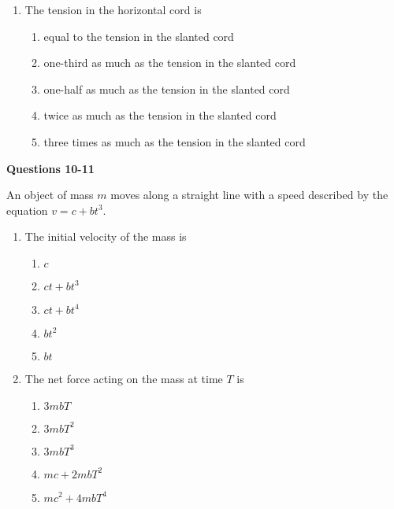 \documentclass{../../oss-apphys}
\begin{document}
\begin{multicols}{2}
\begin{enumerate}[resume,leftmargin=18pt]
  \item The tension in the horizontal cord is
    \begin{enumerate}[noitemsep,topsep=0pt,leftmargin=18pt,label=(\Alph*)]
    \item equal to the tension in the slanted cord
    \item one-third as much as the tension in the slanted cord
    \item one-half as much as the tension in the slanted cord
    \item twice as much as the tension in the slanted cord
    \item three times as much as the tension in the slanted cord
    \end{enumerate}
  \end{enumerate}
  \columnbreak
  
  \textbf{Questions 10-11}

  An object of mass $m$ moves along a straight line with a speed described by
  the equation $v=c+bt^3$.
  \begin{enumerate}[resume,leftmargin=18pt]
  \item The initial velocity of the mass is
    \begin{enumerate}[noitemsep,topsep=0pt,leftmargin=18pt,label=(\Alph*)]
    \item $c$
    \item $ct+bt^3$
    \item $ct+bt^4$
    \item $bt^2$
    \item $bt$
    \end{enumerate}

  \item The net force acting on the mass at time $T$ is
    \begin{enumerate}[noitemsep,topsep=0pt,leftmargin=18pt,label=(\Alph*)]
    \item $3mbT$
    \item $3mbT^2$
    \item $3mbT^3$
    \item $mc+2mbT^2$
    \item $mc^2+4mbT^4$
    \end{enumerate}



\end{enumerate}
\end{multicols}
\end{document}
